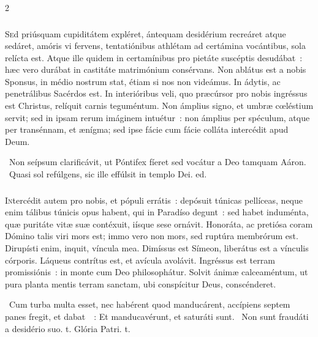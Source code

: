 \documentclass[9pt,twoside]{extarticle}
\begin{document}
\begin{multicols}{2}
{{\subsubsection*{\center {}}
\lettrine{S}ed priúsquam cupiditátem expléret, ántequam desidérium recreáret atque sedáret, amóris vi fervens, tentatiónibus athlétam ad certámina vocántibus, sola relícta est. Atque ille quidem in certamínibus pro pietáte suscéptis desudábat~: hæc vero durábat in castitáte matrimónium consérvans. Non ablátus est a nobis Sponsus, in médio nostrum stat, étiam si nos non videámus. In ádytis, ac penetrálibus Sacérdos est. In interióribus veli, quo præcúrsor pro nobis ingréssus est Christus, relíquit carnis teguméntum. Non ámplius signo, et umbræ cœléstium servit; sed in ipsam rerum imáginem intuétur~: non ámplius per spéculum, atque per transénnam, et ænígma; sed ipse fácie cum fácie colláta intercédit apud Deum.

\begin{tightlist}{}
\item {}~Non seípsum clarificávit, ut Póntifex fíeret \textred{*} sed vocátur a Deo tamquam Aáron. ~Quasi sol refúlgens, sic ille effúlsit in templo Dei. ed.
\end{tightlist}

\subsubsection*{\center {}}
\lettrine{I}ntercédit autem pro nobis, et pópuli errátis~: depósuit túnicas pellíceas, neque enim tálibus túnicis opus habent, qui in Paradíso degunt~: sed habet induménta, quæ puritáte vitæ suæ contéxuit, iísque sese ornávit. Honoráta, ac pretiósa coram Dómino talis viri mors est; immo vero non mors, sed ruptúra membrórum est. Dirupísti enim, inquit, víncula mea. Dimíssus est Símeon, liberátus est a vínculis córporis. Láqueus contrítus est, et avícula avolávit. Ingréssus est terram promissiónis~: in monte cum Deo philosophátur. Solvit ánimæ calceaméntum, ut pura planta mentis terram sanctam, ubi conspícitur Deus, conscénderet.

\begin{tightlist}{}
\item {}~Cum turba multa esset, nec habérent quod manducárent, accípiens septem panes fregit, et dabat~~: \textred{*} Et manducavérunt, et saturáti sunt. ~Non sunt fraudáti a desidério suo. t. Glória Patri. t.
\end{tightlist}

}}
\end{multicols}
\end{document}
